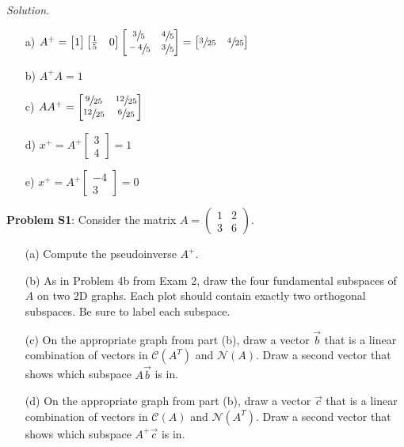 \documentclass[12pt,pdftex]{article}
\begin{document}
\begin{itemize}
\textit{Solution.}
\begin{itemize}
\item[a)] $A^+=\begin{bmatrix}
			1
			\end{bmatrix}
			\begin{bmatrix}
			\frac{1}{5} & 0
			\end{bmatrix}\begin{bmatrix}
			\sfrac{3}{5} & \sfrac{4}{5} \\ \sfrac{-4}{5} & \sfrac{3}{5}
			\end{bmatrix}=\begin{bmatrix}
			\sfrac{3}{25} & \sfrac{4}{25}
			\end{bmatrix}$
\item[b)] $A^+A=1$
\item[c)] $AA^+=\begin{bmatrix}
			\sfrac{9}{25} & \sfrac{12}{25} \\ \sfrac{12}{25} & \sfrac{6}{25}
			\end{bmatrix}$
\item[d)] $x^+=A^+\begin{bmatrix}
			3 \\ 4
			\end{bmatrix}=1$
\item[e)] $x^+=A^+\begin{bmatrix}
			-4 \\ 3
			\end{bmatrix}=0$
\end{itemize}

\end{itemize}  

\noindent \textbf{Problem S1}: Consider the matrix $A=\left(\begin{array}{cc} 1 
& 2\\ 3 & 6\end{array}\right)$. 
\begin{itemize}
\vspace{-10pt}
\item[(a)] Compute the pseudoinverse $A^+$.  
\item[(b)] As in Problem 4b from Exam 2, draw the four fundamental subspaces of 
$A$ on two 2D graphs.  Each plot should contain exactly two orthogonal 
subspaces. Be sure to label each subspace.
\item[(c)] On the appropriate graph from part (b), draw a vector $\vec{b}$ that 
is a linear combination of vectors in $\mathcal{C}(A^T)$ and $\mathcal{N}(A)$.  
Draw a second vector that shows which subspace $A\vec{b}$ is in.
\item[(d)] On the appropriate graph from part (b), draw a vector $\vec{c}$ that 
is a linear combination of vectors in $\mathcal{C}(A)$ and $\mathcal{N}(A^T)$.  
Draw a second vector that shows which subspace $A^+\vec{c}$ is in.\\
\end{itemize}
\end{document}
